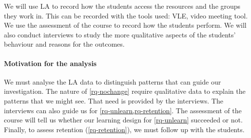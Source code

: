 We will use \ac{LA} to record how the students access the resources and the 
groups they work in.
This can be recorded with the tools used: \ac{VLE}, video meeting tool.
We use the assessment of the course to record how the students perform.
We will also conduct interviews to study the more qualitative aspects of the 
students' behaviour and reasons for the outcomes.

\paragraph{Motivation for the analysis}

We must analyse the \ac{LA} data to distinguish patterns that can guide our 
investigation.
The nature of \cref{rq-nochange} require qualitative data to explain the 
patterns that we might see.
That need is provided by the interviews.
The interviews can also guide us for \cref{rq-unlearn,rq-retention}.
The assessment of the course will tell us whether our learning design for 
\cref{rq-unlearn} succeeded or not.
Finally, to assess retention (\cref{rq-retention}), we must follow up with the 
students.

